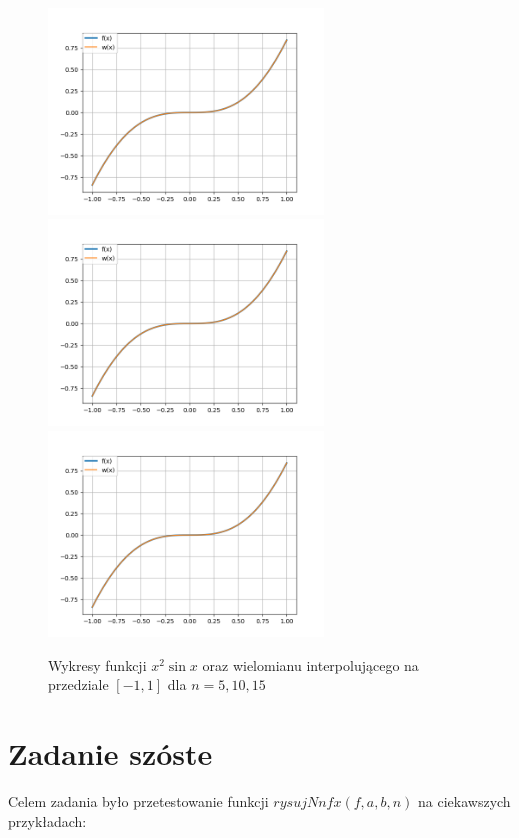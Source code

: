 \documentclass{article}
\begin{document}
\begin{figure}[H]
    \centering
    \includegraphics[width=0.65\textwidth]{plots/5b_5.png}
    \includegraphics[width=0.65\textwidth]{plots/5b_10.png}
    \includegraphics[width=0.65\textwidth]{plots/5b_15.png}
    \caption{Wykresy funkcji $x^2\sin x$ oraz wielomianu interpolującego na przedziale 
    $[-1,1]$ dla $n=5,10,15$}
\end{figure}

\section{Zadanie szóste}
Celem zadania było przetestowanie funkcji  
$rysujNnfx(f,a,b,n)$ na ciekawszych 
przykładach:
\end{document}
